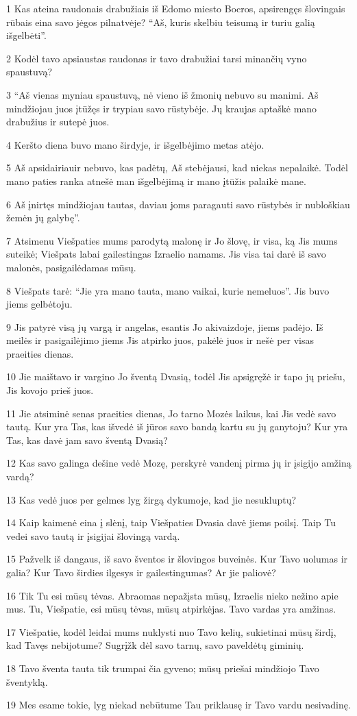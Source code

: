 \par 1 Kas ateina raudonais drabužiais iš Edomo miesto Bocros, apsirengęs šlovingais rūbais eina savo jėgos pilnatvėje? “Aš, kuris skelbiu teisumą ir turiu galią išgelbėti”. 
\par 2 Kodėl tavo apsiaustas raudonas ir tavo drabužiai tarsi minančių vyno spaustuvą? 
\par 3 “Aš vienas myniau spaustuvą, nė vieno iš žmonių nebuvo su manimi. Aš mindžiojau juos įtūžęs ir trypiau savo rūstybėje. Jų kraujas aptaškė mano drabužius ir sutepė juos. 
\par 4 Keršto diena buvo mano širdyje, ir išgelbėjimo metas atėjo. 
\par 5 Aš apsidairiau­ir nebuvo, kas padėtų, Aš stebėjausi, kad niekas nepalaikė. Todėl mano paties ranka atnešė man išgelbėjimą ir mano įtūžis palaikė mane. 
\par 6 Aš įnirtęs mindžiojau tautas, daviau joms paragauti savo rūstybės ir nubloškiau žemėn jų galybę”. 
\par 7 Atsimenu Viešpaties mums parodytą malonę ir Jo šlovę, ir visa, ką Jis mums suteikė; Viešpats labai gailestingas Izraelio namams. Jis visa tai darė iš savo malonės, pasigailėdamas mūsų. 
\par 8 Viešpats tarė: “Jie yra mano tauta, mano vaikai, kurie nemeluos”. Jis buvo jiems gelbėtoju. 
\par 9 Jis patyrė visą jų vargą ir angelas, esantis Jo akivaizdoje, jiems padėjo. Iš meilės ir pasigailėjimo jiems Jis atpirko juos, pakėlė juos ir nešė per visas praeities dienas. 
\par 10 Jie maištavo ir vargino Jo šventą Dvasią, todėl Jis apsigręžė ir tapo jų priešu, Jis kovojo prieš juos. 
\par 11 Jie atsiminė senas praeities dienas, Jo tarno Mozės laikus, kai Jis vedė savo tautą. Kur yra Tas, kas išvedė iš jūros savo bandą kartu su jų ganytoju? Kur yra Tas, kas davė jam savo šventą Dvasią? 
\par 12 Kas savo galinga dešine vedė Mozę, perskyrė vandenį pirma jų ir įsigijo amžiną vardą? 
\par 13 Kas vedė juos per gelmes lyg žirgą dykumoje, kad jie nesukluptų? 
\par 14 Kaip kaimenė eina į slėnį, taip Viešpaties Dvasia davė jiems poilsį. Taip Tu vedei savo tautą ir įsigijai šlovingą vardą. 
\par 15 Pažvelk iš dangaus, iš savo šventos ir šlovingos buveinės. Kur Tavo uolumas ir galia? Kur Tavo širdies ilgesys ir gailestingumas? Ar jie paliovė? 
\par 16 Tik Tu esi mūsų tėvas. Abraomas nepažįsta mūsų, Izraelis nieko nežino apie mus. Tu, Viešpatie, esi mūsų tėvas, mūsų atpirkėjas. Tavo vardas yra amžinas. 
\par 17 Viešpatie, kodėl leidai mums nuklysti nuo Tavo kelių, sukietinai mūsų širdį, kad Tavęs nebijotume? Sugrįžk dėl savo tarnų, savo paveldėtų giminių. 
\par 18 Tavo šventa tauta tik trumpai čia gyveno; mūsų priešai mindžiojo Tavo šventyklą. 
\par 19 Mes esame tokie, lyg niekad nebūtume Tau priklausę ir Tavo vardu nesivadinę.



